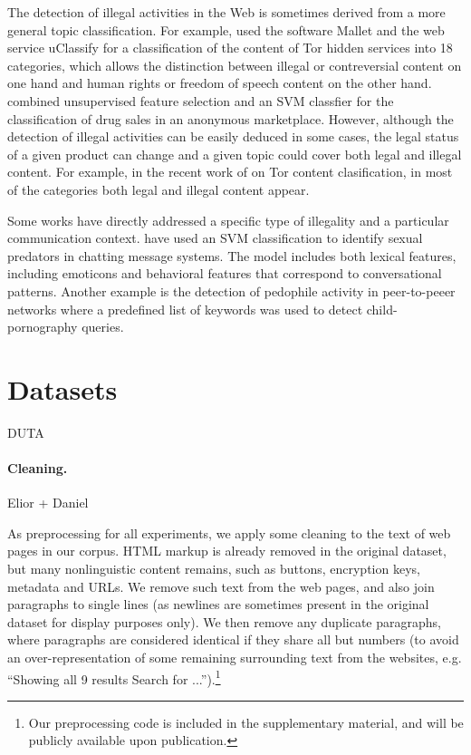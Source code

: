 \documentclass[11pt,a4paper]{article}
\begin{document}
The detection of illegal activities in the Web is sometimes derived from a more general topic classification. For example, \citet{Biryukov14} used the software Mallet \citep{McCallum02} and the web service uClassify \citep{Kagstrom13} for a classification of the content of Tor hidden services into 18 categories, which allows the distinction between illegal or contreversial content on one hand and human rights or freedom of speech content on the other hand. \citet{GraczykKinningham15} combined unsupervised feature selection and an SVM classfier for the classification of drug sales in an anonymous marketplace. However, although the detection of illegal activities can be easily deduced in some cases, the legal status of a given product can change \citep{GraczykKinningham15} and a given topic could cover both legal and illegal content. For example, in the recent work of \citet{Avarikioti18} on Tor content clasification, in most of the categories both legal and illegal content appear.

Some works have directly addressed a specific type of illegality and a particular communication context. \citet{MorrisHirst12} have used an SVM classification to identify sexual predators in chatting message systems. The model includes both lexical features, including emoticons and behavioral features that correspond to conversational patterns. Another example is the detection of pedophile activity in peer-to-peeer networks \citep{Latapy13} where a predefined list of keywords was used to detect child-pornography queries.





\section{Datasets}

DUTA \citep{AlNabki17}

\paragraph{Cleaning.} Elior + Daniel

As preprocessing for all experiments, we apply some cleaning to the text
of web pages in our corpus.
HTML markup is already removed in the original dataset,
but many nonlinguistic content remains, such as
buttons, encryption keys, metadata and URLs.
We remove such text from the web pages, and also join paragraphs to single lines
(as newlines are sometimes present in the original dataset for display purposes
only).
We then remove any duplicate paragraphs, where paragraphs are considered
identical if they share all but numbers
(to avoid an over-representation of some remaining surrounding text from the
websites, e.g. ``Showing all 9 results Search for
...'').\footnote{Our preprocessing code is included in the supplementary
material, and will be publicly available upon publication.}
\end{document}
